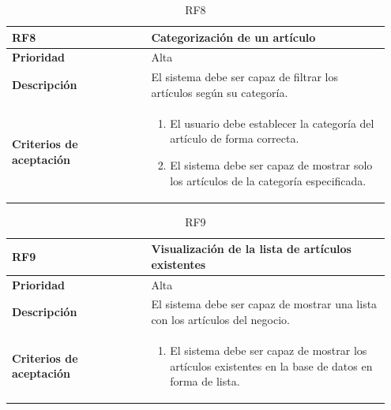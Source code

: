 \begin{table}[htb!]
	\centering %
	\begin{tabular}{|p{0.35\linewidth}|p{0.6\linewidth}|}
		\hline
		\rowcolor{grayshade} \textbf{RF8} & \textbf{Categorización de un artículo} \\
		\hline
		\textbf{Prioridad} & Alta \\
		\hline
		\textbf{Descripción} & El sistema debe ser capaz de filtrar los artículos según su categoría.\\
		\hline
		\vspace{0.5mm}
		\textbf{Criterios de aceptación} & 
		\begin{minipage}[t]{0.9\linewidth}
			\begin{enumerate}
				\item El usuario debe establecer la categoría del artículo de forma correcta.
				\item El sistema debe ser capaz de mostrar solo los artículos de la categoría especificada. 
			\end{enumerate}
			\vspace{2mm}
		\end{minipage} \\
		\hline
	\end{tabular}
	\caption{RF8}
\end{table}

\begin{table}[htb!]
	\centering %
	\begin{tabular}{|p{0.35\linewidth}|p{0.6\linewidth}|}
		\hline
		\rowcolor{grayshade} \textbf{RF9} & \textbf{Visualización de la lista de artículos existentes} \\
		\hline
		\textbf{Prioridad} & Alta \\
		\hline
		\textbf{Descripción} & El sistema debe ser capaz de mostrar una lista con los artículos del negocio.\\
		\hline
		\vspace{0.5mm}
		\textbf{Criterios de aceptación} & 
		\begin{minipage}[t]{0.9\linewidth}
			\begin{enumerate}
				\item El sistema debe ser capaz de mostrar los artículos existentes en la base de datos en forma de lista. 
			\end{enumerate}
			\vspace{2mm}
		\end{minipage} \\
		\hline
	\end{tabular}
	\caption{RF9}
\end{table}

